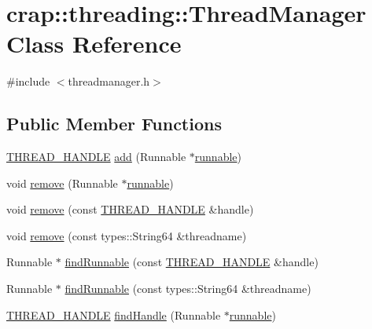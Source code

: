 \hypertarget{classcrap_1_1threading_1_1_thread_manager}{\section{crap\-:\-:threading\-:\-:Thread\-Manager Class Reference}
\label{classcrap_1_1threading_1_1_thread_manager}
}


{\ttfamily \#include $<$threadmanager.\-h$>$}

\subsection*{Public Member Functions}
\begin{DoxyCompactItemize}
\item 
\hyperlink{threading_8h_a14c0f3061b88e46a595ca858fed22b03}{T\-H\-R\-E\-A\-D\-\_\-\-H\-A\-N\-D\-L\-E} \hyperlink{classcrap_1_1threading_1_1_thread_manager_aaeccfd4b65001642a1f9cd59fdb985fa}{add} (Runnable $\ast$\hyperlink{classcrap_1_1runnable}{runnable})
\item 
void \hyperlink{classcrap_1_1threading_1_1_thread_manager_ad0e52664aab18247bd1294fbbeb6a8b2}{remove} (Runnable $\ast$\hyperlink{classcrap_1_1runnable}{runnable})
\item 
void \hyperlink{classcrap_1_1threading_1_1_thread_manager_a61561fe09c4cdf472f35d3ae763cad9a}{remove} (const \hyperlink{threading_8h_a14c0f3061b88e46a595ca858fed22b03}{T\-H\-R\-E\-A\-D\-\_\-\-H\-A\-N\-D\-L\-E} \&handle)
\item 
void \hyperlink{classcrap_1_1threading_1_1_thread_manager_ada856b6234d3fe8010ee92fba6526e14}{remove} (const types\-::\-String64 \&threadname)
\item 
Runnable $\ast$ \hyperlink{classcrap_1_1threading_1_1_thread_manager_aa411007323b7b944e06daa65c98d41ec}{find\-Runnable} (const \hyperlink{threading_8h_a14c0f3061b88e46a595ca858fed22b03}{T\-H\-R\-E\-A\-D\-\_\-\-H\-A\-N\-D\-L\-E} \&handle)
\item 
Runnable $\ast$ \hyperlink{classcrap_1_1threading_1_1_thread_manager_af9ff93eaf11cb252fed3e8b7f958b0ee}{find\-Runnable} (const types\-::\-String64 \&threadname)
\item 
\hyperlink{threading_8h_a14c0f3061b88e46a595ca858fed22b03}{T\-H\-R\-E\-A\-D\-\_\-\-H\-A\-N\-D\-L\-E} \hyperlink{classcrap_1_1threading_1_1_thread_manager_a59b7d854f67e361e441bf83e321e256a}{find\-Handle} (Runnable $\ast$\hyperlink{classcrap_1_1runnable}{runnable})
\item 

\end{DoxyCompactItemize}
